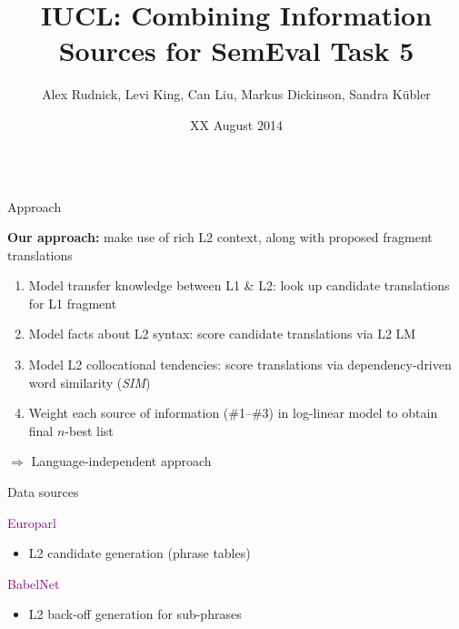 \documentclass[final,t]{beamer}
\title[]{IUCL: Combining Information Sources for SemEval Task 5}
\author[]{Alex Rudnick, Levi King, Can Liu, Markus Dickinson, Sandra K\"ubler}
\institute[]{Indiana University}
\date[]{XX August 2014}
\begin{document}
\begin{frame}{}
  \begin{columns}[t]
    \begin{column}{.35\linewidth}

\begin{block}{Approach}

  \textbf{Our approach:} make use of rich L2 context, along with
  proposed fragment translations

  \medskip

  \begin{enumerate}
  \item Model transfer knowledge between L1 \& L2: look up candidate
    translations for L1 fragment
  \item Model facts about L2 syntax: score candidate translations via
    L2 LM
  \item Model L2 collocational tendencies: score translations via
    dependency-driven word similarity (\textit{SIM})
  \item Weight each source of information (\#1--\#3) in log-linear
    model to obtain final $n$-best list
  \end{enumerate}

  $\Rightarrow$ Language-independent approach

\end{block}

\begin{block}{Data sources}

\begin{center}
\textcolor{purple}{Europarl}
\end{center}

\colorbox{light-gray}{
\begin{minipage}{.90\linewidth}
\begin{itemize}
\item L2 candidate generation (phrase tables)
\end{itemize}
\end{minipage}
}

\begin{center}
\textcolor{purple}{BabelNet}
\end{center}

\colorbox{light-gray}{
\begin{minipage}{.90\linewidth}
\begin{itemize}
\item L2 back-off generation for sub-phrases
\end{itemize}
\end{minipage}
}


\end{block}
\end{column}
\end{columns}
\end{frame}
\end{document}
